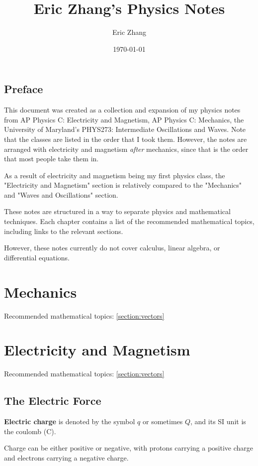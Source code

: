 \documentclass[a4paper, titlepage]{book}
\title{
    Eric Zhang's Physics Notes
}
\author{Eric Zhang}
\date{\today}
\numberwithin{equation}{section}
\begin{document}
\frontmatter
\maketitle
\tableofcontents


\chapter{Preface}

This document was created as a collection and expansion of my physics notes
from AP Physics C: Electricity and Magnetism, AP Physics C: Mechanics,
the University of Maryland's PHYS273: Intermediate Oscillations and Waves.
Note that the classes are listed in the order that I took them.
However, the notes are arranged with electricity and magnetism \emph{after} mechanics,
since that is the order that most people take them in.

As a result of electricity and magnetism being my first physics class,
the "Electricity and Magnetism" section is relatively
compared to the "Mechanics" and "Waves and Oscillations" section.

These notes are structured in a way to separate physics and mathematical techniques.
Each chapter contains a list of the recommended mathematical topics,
including links to the relevant sections.

However, these notes currently do not cover calculus, linear algebra,
or differential equations.


\mainmatter
\part{Mechanics}

Recommended mathematical topics: \ref{section:vectors}

\part{Electricity and Magnetism}

Recommended mathematical topics: \ref{section:vectors}

\chapter{The Electric Force}

\textbf{Electric charge} is denoted by the symbol \(q\) or sometimes \(Q\),
and its SI unit is the coulomb (C).

Charge can be either positive or negative,
with protons carrying a positive charge and electrons carrying a negative charge.
\end{document}
